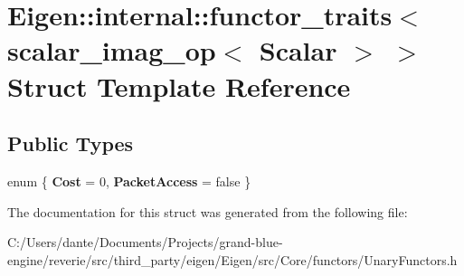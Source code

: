 \hypertarget{struct_eigen_1_1internal_1_1functor__traits_3_01scalar__imag__op_3_01_scalar_01_4_01_4}{}\section{Eigen\+::internal\+::functor\+\_\+traits$<$ scalar\+\_\+imag\+\_\+op$<$ Scalar $>$ $>$ Struct Template Reference}
\label{struct_eigen_1_1internal_1_1functor__traits_3_01scalar__imag__op_3_01_scalar_01_4_01_4}
\subsection*{Public Types}
\begin{DoxyCompactItemize}
\item 
\mbox{\label{struct_eigen_1_1internal_1_1functor__traits_3_01scalar__imag__op_3_01_scalar_01_4_01_4_a048f7811819f933fcc52bebdbd31788a}} 
enum \{ {\bfseries Cost} = 0, 
{\bfseries Packet\+Access} = false
 \}
\end{DoxyCompactItemize}


The documentation for this struct was generated from the following file\+:\begin{DoxyCompactItemize}
\item 
C\+:/\+Users/dante/\+Documents/\+Projects/grand-\/blue-\/engine/reverie/src/third\+\_\+party/eigen/\+Eigen/src/\+Core/functors/Unary\+Functors.\+h\end{DoxyCompactItemize}
